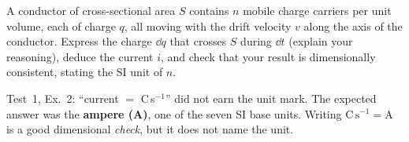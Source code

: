 \documentclass{ibetest}
\begin{document}
A conductor of cross-sectional area $S$ contains $n$ mobile charge carriers per unit volume,
each of charge $q$, all moving with the drift velocity $v$ along the axis of the conductor.
Express the charge $\dd q$ that crosses $S$ during $\dd t$ (explain your reasoning), deduce
the current $i$, and check that your result is dimensionally consistent, stating the SI unit
of $n$.
\begin{scheme}
\end{scheme}
\begin{tip}
Test~1, Ex.~2: ``current $=$ C\,s$^{-1}$'' did not earn the unit mark. The expected answer
was the \textbf{ampere (A)}, one of the seven SI base units. Writing
$\mathrm{C\,s^{-1}} = \mathrm{A}$ is a good dimensional \emph{check}, but it does not name the
unit.
\end{tip}
\end{document}
